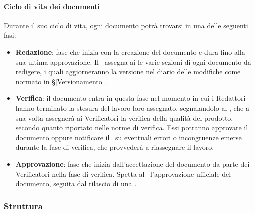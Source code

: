 			\paragraph{Ciclo di vita dei documenti}\label{PS:Documentazione:Implementazione:CicloVita}
			Durante il suo ciclo di vita, ogni documento potrà trovarsi in una delle seguenti fasi:
			\begin{itemize}
				\item \textbf{Redazione}: fase che inizia con la creazione del documento e dura fino alla sua ultima approvazione.
					Il \Res\ assegna ai  le varie sezioni di ogni documento da redigere, i quali aggiorneranno la versione nel diario delle modifiche
					come normato in \S\ref{Versionamento}.
				\item \textbf{Verifica}: il documento entra in questa fase nel momento in cui i Redattori hanno terminato la stesura del lavoro loro assegnato, segnalandolo al \Res, che a sua volta assegnerà ai Verificatori la verifica della qualità del prodotto, secondo quanto riportato nelle norme di verifica. Essi potranno approvare il documento oppure notificare il \Res\ su eventuali errori o incongruenze emerse durante la fase di verifica, che provvederà a riassegnare il lavoro.
				\item \textbf{Approvazione}: fase che inizia dall'accettazione del documento da parte dei Verificatori nella fase di verifica. Spetta al \Res\
					l'approvazione ufficiale del documento, seguita dal rilascio di una .
			\end{itemize}

		\subsubsection{Struttura}\label{PS:Documentazione:Struttura}

